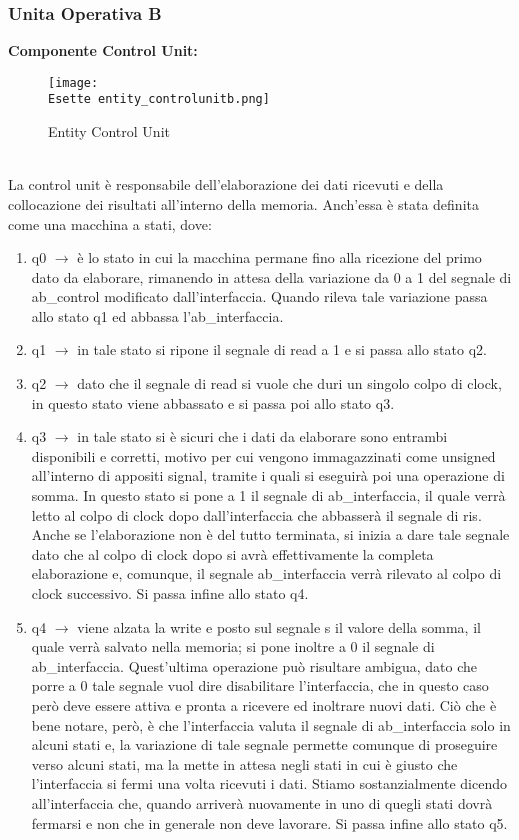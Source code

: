 \documentclass[12pt]{article}
\def \Esette {Allegati/Esercizio7/}
\begin{document}
\subsubsection{Unita Operativa B}
{\large \textbf{Componente Control Unit:}}
\begin{figure}[ht!]
    \centering
    \texttt{[image: \\Esette entity\_controlunitb.png]}
    \caption{Entity Control Unit}
\end{figure}
\\La control unit è responsabile dell’elaborazione dei dati ricevuti e della collocazione dei risultati all’interno della memoria. Anch’essa è stata definita come una macchina a stati, dove:
\begin{enumerate}
    \item q0 $\rightarrow$ è lo stato in cui la macchina permane fino alla ricezione del primo dato da elaborare, rimanendo in attesa della variazione da 0 a 1 del segnale di ab\_control modificato dall’interfaccia.
          Quando rileva tale variazione passa allo stato q1 ed abbassa l’ab\_interfaccia.
    \item q1 $\rightarrow$ in tale stato si ripone il segnale di read a 1  e si passa allo stato q2.
    \item q2 $\rightarrow$ dato che il segnale di read si vuole che duri un singolo colpo di clock, in questo stato viene abbassato e si passa poi allo stato q3.
    \item q3 $\rightarrow$ in tale stato si è sicuri che i dati da elaborare sono entrambi disponibili e corretti, motivo per cui vengono immagazzinati come unsigned all’interno di appositi signal, tramite i quali si eseguirà poi una operazione di somma. In questo stato si pone a 1 il segnale di ab\_interfaccia, il quale verrà letto al colpo di clock dopo dall’interfaccia che abbasserà il segnale di ris. Anche se l’elaborazione non è del tutto terminata, si inizia a dare tale segnale dato che al colpo di clock dopo si avrà effettivamente la completa elaborazione e, comunque, il segnale ab\_interfaccia verrà rilevato al colpo di clock successivo. Si passa infine allo stato q4.
    \item q4 $\rightarrow$ viene alzata la write e posto sul segnale s il valore della somma, il quale verrà salvato nella memoria; si pone inoltre a 0 il segnale di ab\_interfaccia. Quest’ultima operazione può risultare ambigua, dato che porre a 0 tale segnale vuol dire disabilitare l’interfaccia, che in questo caso però deve essere attiva e pronta a ricevere ed inoltrare nuovi dati. Ciò che è bene notare, però, è che l’interfaccia valuta il segnale di ab\_interfaccia solo in alcuni stati e, la variazione di tale segnale permette comunque di proseguire verso alcuni stati, ma la mette in attesa negli stati in cui è giusto che l’interfaccia si fermi una volta ricevuti i dati. Stiamo sostanzialmente dicendo all’interfaccia che, quando arriverà nuovamente in uno di quegli stati dovrà fermarsi e non che in generale non deve lavorare. Si passa infine allo stato q5.

\end{enumerate}
\end{document}
